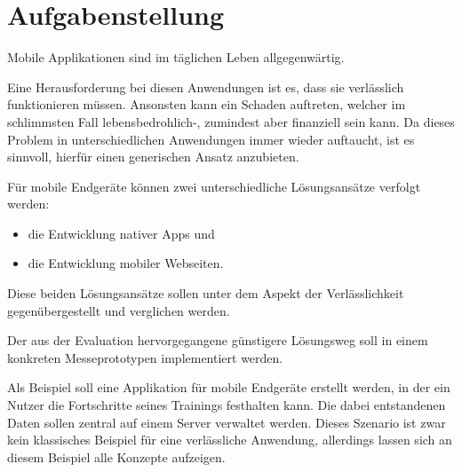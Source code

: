 \chapter*{Aufgabenstellung}
\label{cha:augabenstellung}

Mobile Applikationen sind im täglichen Leben allgegenwärtig.
 
Eine Herausforderung bei diesen Anwendungen ist es, dass sie verlässlich funktionieren müssen. Ansonsten kann ein Schaden auftreten, welcher im schlimmsten Fall lebensbedrohlich-, zumindest aber finanziell sein kann. Da dieses Problem in unterschiedlichen Anwendungen  immer wieder auftaucht, ist es sinnvoll, hierfür einen generischen Ansatz anzubieten. 

Für mobile Endgeräte können zwei unterschiedliche Lösungsansätze verfolgt werden: 
\begin{itemize}
\item die Entwicklung nativer Apps und
\item die Entwicklung mobiler Webseiten.
\end{itemize}
Diese beiden Lösungsansätze sollen unter dem Aspekt der Verlässlichkeit gegenübergestellt und verglichen werden.

Der aus der Evaluation hervorgegangene günstigere Lösungsweg soll in einem konkreten Messeprototypen implementiert werden.

Als Beispiel soll eine Applikation für mobile Endgeräte erstellt werden, in der ein Nutzer die Fortschritte seines Trainings festhalten kann. 
Die dabei entstandenen Daten sollen zentral auf einem Server verwaltet werden. 
Dieses Szenario ist zwar kein klassisches Beispiel für eine verlässliche Anwendung, allerdings lassen sich an diesem Beispiel alle Konzepte aufzeigen.
